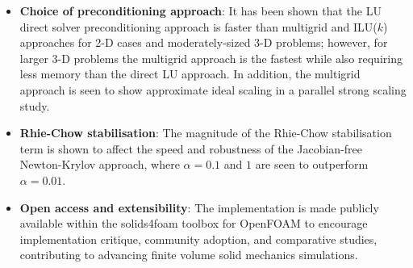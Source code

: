 \documentclass[sn-mathphys,Numbered]{sn-jnl}%
\begin{document}
\begin{itemize}
	\item \textbf{Choice of preconditioning approach}: It has been shown that the LU direct solver preconditioning approach is faster than multigrid and ILU($k$) approaches for 2-D cases and moderately-sized 3-D problems; however, for larger 3-D problems the multigrid approach is the fastest while also requiring less memory than the direct LU approach. In addition, the multigrid approach is seen to show approximate ideal scaling in a parallel strong scaling study.
	
	\item \textbf{Rhie-Chow stabilisation}: The magnitude of the Rhie-Chow stabilisation term is shown to affect the speed and robustness of the Jacobian-free Newton-Krylov approach, where $\alpha = 0.1$ and $1$ are seen to outperform $\alpha = 0.01$.

	\item \textbf{Open access and extensibility}: The implementation is made publicly available within the solids4foam toolbox for OpenFOAM to encourage implementation critique, community adoption, and comparative studies, contributing to advancing finite volume solid mechanics simulations.
\end{itemize}

\end{document}
